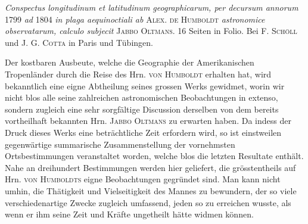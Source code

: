 \emph{Conspectus longitudinum et latitudinum geographicarum, per decursum annorum} 1799 \emph{ad} 1804 \emph{in plaga aequinoctiali ab} \textsc{Alex. de Humboldt} \emph{astronomice observatarum, calculo subjecit} \textsc{Jabbo Oltmans}. 16 Seiten in Folio. Bei \textsc{F. Schöll} und \textsc{J. G. Cotta} in Paris und Tübingen.

Der kostbaren Ausbeute, welche die Geographie der Amerikanischen Tropenländer durch die Reise des Hrn. \textsc{von Humboldt} erhalten hat, wird bekanntlich eine eigne Abtheilung seines grossen Werks gewidmet, worin wir nicht blos alle seine zahlreichen astronomischen Beobachtungen in extenso, sondern zugleich eine sehr sorgfältige Discussion derselben von dem bereits vortheilhaft bekannten Hrn. \textsc{Jabbo Oltmans} zu erwarten haben. Da indess der Druck dieses Werks eine beträchtliche Zeit erfordern wird, so ist einstweilen gegenwärtige summarische Zusammenstellung der vornehmsten Ortsbestimmungen veranstaltet worden, welche blos die letzten Resultate enthält. Nahe an dreihundert Bestimmungen werden hier geliefert, die grösstentheils auf Hrn. \textsc{von Humboldts} eigne Beobachtungen gegründet sind. Man kann nicht umhin, die Thätigkeit und Vielseitigkeit des Mannes zu bewundern, der so viele verschiedenartige Zwecke zugleich umfassend, jeden so zu erreichen wusste, als wenn er ihm seine Zeit und Kräfte ungetheilt hätte widmen können.
\thispagestyle{gaussVIGathering103}
